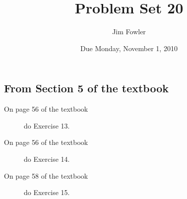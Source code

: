\documentclass[12pt]{handout}
\author{Jim Fowler}
\title{Problem Set 20}
\date{Due Monday, November  1, 2010}
\begin{document}
\maketitle










\subsection*{From Section 5 of the textbook}



\begin{description}

\item[On page 56 of the textbook] do Exercise 13.

\item[On page 56 of the textbook] do Exercise 14.

\item[On page 58 of the textbook] do Exercise 15.

\end{description}
\end{document}
